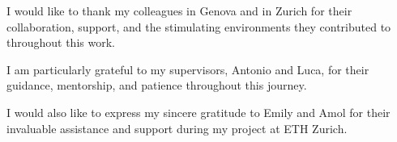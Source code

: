 
\begin{acknowledgements}      
I would like to thank my colleagues in Genova and in Zurich for their collaboration, support, and the stimulating environments they contributed to throughout this work.

I am particularly grateful to my supervisors, Antonio and Luca, for their guidance, mentorship, and patience throughout this journey.

I would also like to express my sincere gratitude to Emily and Amol for their invaluable assistance and support during my project at ETH Zurich.

\end{acknowledgements}
